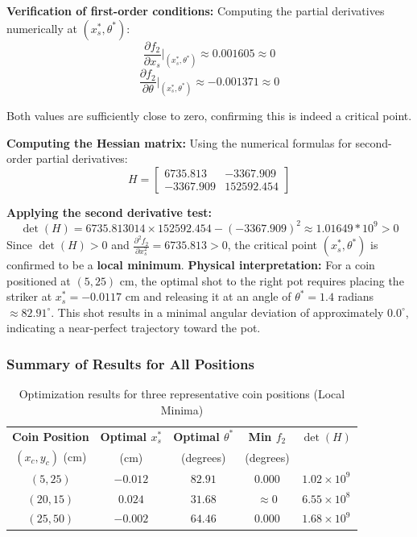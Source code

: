 \documentclass[10pt]{article}
\begin{document}
\textbf{Verification of first-order conditions:}
Computing the partial derivatives numerically at $(x_s^*, \theta^*)$:
\[
\frac{\partial f_2}{\partial x_s}\bigg|_{(x_s^*, \theta^*)} \approx 0.001605 \approx 0
\]
\[
\frac{\partial f_2}{\partial \theta}\bigg|_{(x_s^*, \theta^*)} \approx -0.001371 \approx 0
\]

Both values are sufficiently close to zero, confirming this is indeed a critical point.

\textbf{Computing the Hessian matrix:}
Using the numerical formulas for second-order partial derivatives:
\[
H = \begin{bmatrix}
6735.813 & -3367.909 \\
-3367.909 & 152592.454
\end{bmatrix}
\]

\textbf{Applying the second derivative test:}
\[
\det(H) = 6735.813014 \times 152592.454 - (-3367.909)^2 \approx 1.01649 * 10^9 > 0
\]
Since $\det(H) > 0$ and $\frac{\partial^2 f_2}{\partial x_s^2} = 6735.813 > 0$, the critical point $(x_s^*, \theta^*)$ is confirmed to be a \textbf{local minimum}.
\textbf{Physical interpretation:}
For a coin positioned at $(5, 25)$ cm, the optimal shot to the right pot requires placing the striker at $x_s^* = -0.0117$ cm and releasing it at an angle of $\theta^* = 1.4$ radians $\approx 82.91^\circ$. This shot results in a minimal angular deviation of approximately $0.0^\circ$, indicating a near-perfect trajectory toward the pot.
\subsubsection{Summary of Results for All Positions}

\begin{table}[H]
\centering
\begin{tabular}{|c|c|c|c|c|}
\hline
\textbf{Coin Position} & \textbf{Optimal $x_s^*$} & \textbf{Optimal $\theta^*$} & \textbf{Min $f_2$} & \textbf{$\det(H)$} \\
$(x_c, y_c)$ (cm) & (cm) & (degrees) & (degrees) & \\
\hline
$(5, 25)$ & $-0.012$ & $82.91$ & $0.000$ & $1.02 \times 10^9$ \\
$(20, 15)$ & $0.024$ & $31.68$ & $\approx 0$ & $6.55 \times 10^8$ \\
$(25, 50)$ & $-0.002$ & $64.46$ & $0.000$ & $1.68 \times 10^9$ \\
\hline
\end{tabular}
\caption{Optimization results for three representative coin positions (Local Minima)}
\end{table}
\end{document}
